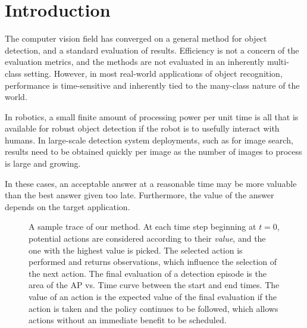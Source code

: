 \section{Introduction}

The computer vision field has converged on a general method for object detection, and a standard evaluation of results.
Efficiency is not a concern of the evaluation metrics, and the methods are not evaluated in an inherently multi-class setting.
However, in most real-world applications of object recognition, performance is time-sensitive and inherently tied to the many-class nature of the world.

In robotics, a small finite amount of processing power per unit time is all that is available for robust object detection if the robot is to usefully interact with humans.
In large-scale detection system deployments, such as for image search, results need to be obtained quickly per image as the number of images to process is large and growing.

In these cases, an acceptable answer at a reasonable time may be more valuable than the best answer given too late.
Furthermore, the value of the answer depends on the target application.

\begin{figure}[ht!]
  \caption{
A sample trace of our method.
At each time step beginning at $t=0$, potential actions are considered according to their \emph{value}, and the one with the highest value is picked.
The selected action is performed and returns observations, which influence the selection of the next action.
The final evaluation of a detection episode is the area of the AP vs. Time curve between the start and end times.
The value of an action is the expected value of the final evaluation if the action is taken and the policy continues to be followed, which allows actions without an immediate benefit to be scheduled.
}
  \label{fig:figure1}
\end{figure}

